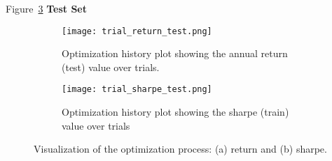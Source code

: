 \documentclass{article}
\begin{document}
Figure~\ref{fig:optimization_plots} \textbf{Test Set}
\begin{figure}[h!]
\centering
\begin{subfigure}{0.48\textwidth}
    \texttt{[image: trial\_return\_test.png]}
    \caption{Optimization history plot showing the annual return (test) value over trials.}
    \label{fig:optimization_history}
\end{subfigure}
\hfill
\begin{subfigure}{0.48\textwidth}
    \texttt{[image: trial\_sharpe\_test.png]}
    \caption{Optimization history plot showing the sharpe (train) value over trials}
    \label{fig:parameter_importances}
\end{subfigure}
\caption{Visualization of the optimization process: (a) return and (b) sharpe.}
\label{fig:optimization_plots}
\end{figure}
\end{document}
